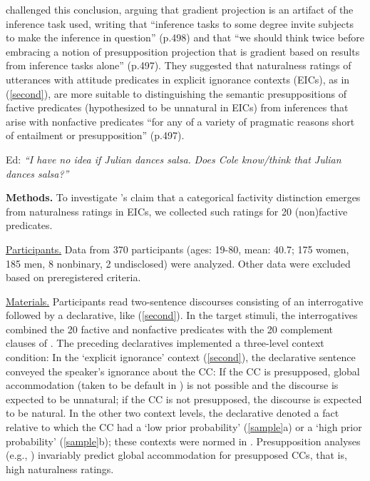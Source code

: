 \documentclass[12pt,fleqn]{article}
\newcommand{\6}{\mbox{$[\hspace*{-.6mm}[$}}
\newcommand{\9}{\mbox{$]\hspace*{-.6mm}]$}}
\newcommand{\citepos}[1]{\citeauthor{#1}'s \citeyear{#1}}
\begin{document}
\citealt{mandelkern-etal2020} challenged this conclusion, arguing that gradient projection is an artifact of the inference task used, writing that ``inference tasks to some degree invite subjects to make the inference in question'' (p.498) and that ``we should think twice before embracing a notion of presupposition projection that is gradient based on results from inference tasks alone'' (p.497). They suggested that naturalness ratings of utterances with attitude predicates in explicit ignorance contexts (EICs), as in (\ref{second}), are more suitable to distinguishing the semantic presuppositions of factive predicates (hypothesized to be unnatural in EICs) from inferences that arise with nonfactive predicates ``for any of a variety of pragmatic reasons short of entailment or presupposition'' (p.497).

\vspace*{-.2cm}
\begin{exe}
\ex\label{second} Ed: \hspace*{-.2cm} {\em ``I have no idea if Julian dances salsa.}  \hspace*{-.1cm} {\em Does Cole know/think that Julian dances salsa?''}
\end{exe}
\vspace*{-.2cm}

\noindent
{\bf Methods.} To investigate \citepos{mandelkern-etal2020} claim that a categorical factivity distinction emerges from naturalness ratings in EICs, we collected such ratings for 20 (non)factive predicates. 

\noindent
\underline{Participants.} Data from 370 participants (ages: 19-80, mean: 40.7; 175 women, 185 men, 8 nonbinary, 2 undisclosed) were analyzed. Other data were excluded based on preregistered criteria.

\noindent
\underline{Materials.} Participants read two-sentence discourses consisting of an interrogative followed by a declarative, like (\ref{second}). In the target stimuli, the interrogatives combined the 20 factive and nonfactive predicates with the 20 complement clauses of \citealt{degen-tonhauser-openmind,degen-tonhauser-language}. The preceding declaratives implemented a three-level context condition: In the `explicit ignorance' context (\ref{second}), the declarative sentence conveyed the speaker's ignorance about the CC: If the CC is presupposed, global accommodation (taken to be default in \citealt{heim83,vds92}) is not possible and the discourse is expected to be unnatural; if the CC is not presupposed, the discourse is expected to be natural. In the other two context levels, the declarative denoted a fact relative to which the CC had a `low prior probability' (\ref{sample}a) or a `high prior probability' (\ref{sample}b); these contexts were normed in \citealt{degen-tonhauser-openmind}. Presupposition analyses (e.g., \citealt{heim83,vds92}) invariably predict global accommodation for presupposed CCs, that is, high naturalness ratings.
\end{document}
